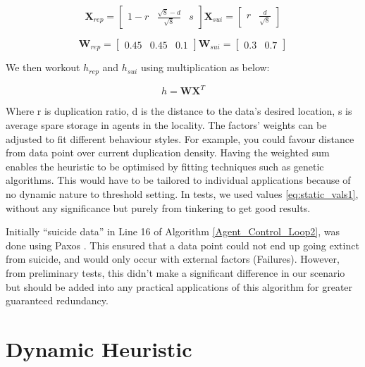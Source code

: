 \documentclass{UoYCSproject}
\begin{document}
\begin{equation}
\label{eq:static_vals2}
\textbf{X}_{rep} = \begin{bmatrix}1-r & \frac{\sqrt{8}-d}{\sqrt{8}} & s \end{bmatrix}
\textbf{X}_{sui} = \begin{bmatrix} r & \frac{d}{\sqrt{8}}\end{bmatrix}
\end{equation}

\begin{equation}
\label{eq:static_vals1}
\textbf{W}_{rep} = \begin{bmatrix}0.45 & 0.45 & 0.1\end{bmatrix}
\textbf{W}_{sui} = \begin{bmatrix}0.3 & 0.7 \end{bmatrix}
\end{equation}

We then workout $h_{rep}$ and $h_{sui}$ using multiplication as below:

\begin{equation}
\label{eq:10}
h = \textbf{W} \textbf{X} ^{T}
\end{equation}

Where r is duplication ratio, d is the distance to the data's desired location, s is average spare storage in agents in the locality.
The factors' weights can be adjusted to fit different behaviour styles.
For example, you could favour distance from data point over current duplication density.
Having the weighted sum enables the heuristic to be optimised by fitting techniques such as genetic algorithms.
This would have to be tailored to individual applications because of no dynamic nature to threshold setting.
In tests, we used values \ref{eq:static_vals1}, without any significance but purely from tinkering to get good results.

Initially “suicide data” in Line 16 of Algorithm \ref{Agent_Control_Loop2}, was done using Paxos \cite{Paxos}.
This ensured that a data point could not end up going extinct from suicide, and would only occur with external factors (Failures).
However, from preliminary tests, this didn’t make a significant difference in our scenario but should be added into any practical applications of this algorithm for greater guaranteed redundancy.


\section{Dynamic Heuristic}
\label{sec:Simple3}
\end{document}
